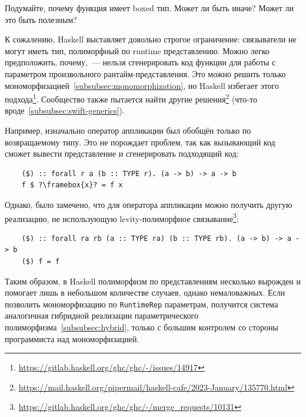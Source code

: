 \begin{task}
    Подумайте, почему функция имеет boxed тип.
    Может ли быть иначе?
    Может ли это быть полезным?
\end{task}

К сожалению, Haskell выставляет довольно строгое ограничение: связыватели не могут иметь тип, полиморфный по runtime представлению.
Можно легко предположить, почему,~--- нельзя сгенерировать код функции для работы с параметром произвольного рантайм-представления.
Это можно решить только мономорфизацией~\ref{subsubsec:monomorphization}, но Haskell избегает этого подхода\footnote{\url{https://gitlab.haskell.org/ghc/ghc/-/issues/14917}}.
Сообщество также пытается найти другие решения\footnote{\url{https://mail.haskell.org/pipermail/haskell-cafe/2023-January/135770.html}} (что-то вроде~\ref{subsubsec:swift-generics}).

Например, изначально оператор аппликации был обобщён только по возвращаемому типу.
Это не порождает проблем, так как вызывающий код сможет вывести представление и сгенерировать подходящий код:
\begin{verbatim}
    ($) :: forall r a (b :: TYPE r). (a -> b) -> a -> b
    f $ ?\framebox{x}? = f x
\end{verbatim}

Однако, было замечено, что для оператора аппликации можно получить другую реализацию, не использующую levity-полиморфное связывание\footnote{\url{https://gitlab.haskell.org/ghc/ghc/-/merge_requests/10131}}:
\begin{verbatim}
    ($) :: forall ra rb (a :: TYPE ra) (b :: TYPE rb). (a -> b) -> a -> b
    ($) f = f
\end{verbatim}

Таким образом, в Haskell полиморфизм по представлениям несколько вырожден и помогает лишь в небольшом количестве случаев, однако немаловажных.
Если позволить мономорфизацию по \texttt{RuntimeRep} параметрам, получится система аналогичная гибридной реализации параметрического полиморфизма~\ref{subsubsec:hybrid}, только с большим контролем со стороны программиста над мономорфизацией.
